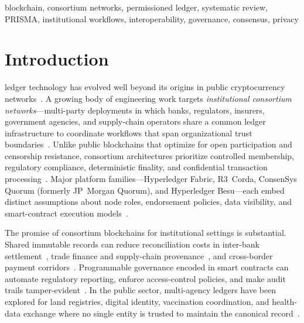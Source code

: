 \documentclass[journal]{IEEEtran}
\begin{document}
\begin{IEEEkeywords}
blockchain, consortium networks, permissioned ledger, systematic review, PRISMA, institutional workflows, interoperability, governance, consensus, privacy
\end{IEEEkeywords}

\section{Introduction}
\label{sec:introduction}

 ledger technology has evolved well beyond its origins in public cryptocurrency networks~\cite{nakamoto2008bitcoin,wood2014ethereum}.
A growing body of engineering work targets \emph{institutional consortium networks}---multi-party deployments in which banks, regulators, insurers, government agencies, and supply-chain operators share a common ledger infrastructure to coordinate workflows that span organizational trust boundaries~\cite{xu2017taxonomy,belotti2019vademecum,casino2019systematic}.
Unlike public blockchains that optimize for open participation and censorship resistance, consortium architectures prioritize controlled membership, regulatory compliance, deterministic finality, and confidential transaction processing~\cite{hyperledger2018arch,cachin2016architecture}.
Major platform families---Hyperledger Fabric, R3~Corda, ConsenSys Quorum (formerly JP~Morgan Quorum), and Hyperledger Besu---each embed distinct assumptions about node roles, endorsement policies, data visibility, and smart-contract execution models~\cite{androulaki2018hyperledger,brown2016corda,baliga2018performance}.

The promise of consortium blockchains for institutional settings is substantial.
Shared immutable records can reduce reconciliation costs in inter-bank settlement~\cite{guo2016blockchain}, trade finance and supply-chain provenance~\cite{chang2020supplychain,malik2019trustchain,montecchi2021survey,jadon2024electronics}, and cross-border payment corridors~\cite{danezis2015centrally}.
Programmable governance encoded in smart contracts can automate regulatory reporting, enforce access-control policies, and make audit trails tamper-evident~\cite{defilippi2018blockchain}.
In the public sector, multi-agency ledgers have been explored for land registries, digital identity, vaccination coordination, and health-data exchange where no single entity is trusted to maintain the canonical record~\cite{olnes2017blockchain,mcghin2019blockchain,costa2022vaccination,tahir2024healthcare,villarreal2023healthcareinterop}.
\end{document}
